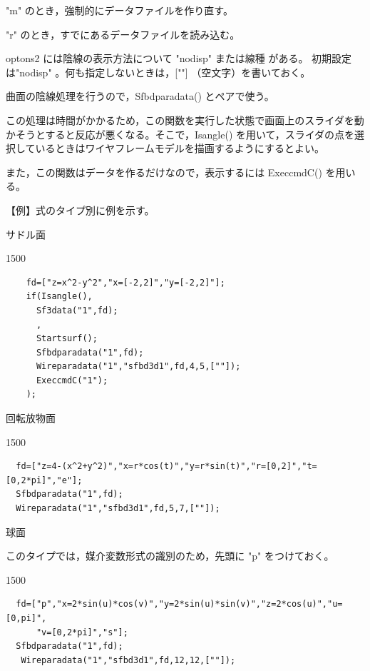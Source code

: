 \documentclass[papersize,a4paper,12pt,uplatex]{jsarticle}
\begin{document}
\begin{description}
  "m"  のとき，強制的にデータファイルを作り直す。
  
  "r" のとき，すでにあるデータファイルを読み込む。
  
optons2 には陰線の表示方法について "nodisp" または線種 がある。 初期設定は"nodisp" 。何も指定しないときは，[""] （空文字）を書いておく。

曲面の陰線処理を行うので，Sfbdparadata() とペアで使う。

この処理は時間がかかるため，この関数を実行した状態で画面上のスライダを動かそうとすると反応が悪くなる。そこで，Isangle() を用いて，スライダの点を選択しているときはワイヤフレームモデルを描画するようにするとよい。

また，この関数はデータを作るだけなので，表示するには ExeccmdC() を用いる。

\vspace{\baselineskip} 
【例】式のタイプ別に例を示す。

\vspace{\baselineskip}
サドル面

\begin{layer}{150}{0}
\end{layer}
\begin{verbatim}
    fd=["z=x^2-y^2","x=[-2,2]","y=[-2,2]"];
    if(Isangle(),
      Sf3data("1",fd);
      ,
      Startsurf();
      Sfbdparadata("1",fd);
      Wireparadata("1","sfbd3d1",fd,4,5,[""]);
      ExeccmdC("1");
    );
\end{verbatim}

回転放物面

\begin{layer}{150}{0}
\end{layer}
\begin{verbatim}
  fd=["z=4-(x^2+y^2)","x=r*cos(t)","y=r*sin(t)","r=[0,2]","t=[0,2*pi]","e"];
  Sfbdparadata("1",fd);
  Wireparadata("1","sfbd3d1",fd,5,7,[""]);
\end{verbatim}
\vspace{25mm}

球面

このタイプでは，媒介変数形式の識別のため，先頭に "p" をつけておく。

\begin{layer}{150}{0}
\end{layer}
\begin{verbatim}
  fd=["p","x=2*sin(u)*cos(v)","y=2*sin(u)*sin(v)","z=2*cos(u)","u=[0,pi]",
      "v=[0,2*pi]","s"];
  Sfbdparadata("1",fd);
   Wireparadata("1","sfbd3d1",fd,12,12,[""]); 
\end{verbatim}


\end{description}
\end{document}
